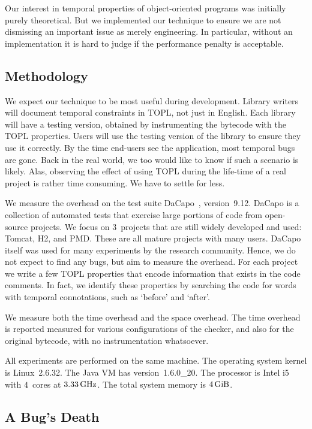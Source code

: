 \documentclass[9pt, preprint]{sigplanconf} %
\theoremstyle{definition}
\theoremstyle{remark}
\begin{document}
Our interest in temporal properties of object-oriented programs was initially purely theoretical.
But we implemented our technique to ensure we are not dismissing an important issue as merely engineering.
In particular, without an implementation it is hard to judge if the performance penalty is acceptable.

\subsection{Methodology} %

We expect our technique to be most useful during development.
Library writers will document temporal constraints in TOPL, not just in English.
Each library will have a testing version, obtained by instrumenting the bytecode with the TOPL properties.
Users will use the testing version of the library to ensure they use it correctly.
By the time end-users see the application, most temporal bugs are gone.
Back in the real world, we too would like to know if such a scenario is likely.
Alas, observing the effect of using TOPL during the life-time of a real project is rather time consuming.
We have to settle for less.

We measure the overhead on the test suite DaCapo~\cite{dblp:conf/oopsla/dacapo}, version~9.12.
DaCapo is a collection of automated tests that exercise large portions of code from open-source projects.
We focus on $3$~projects that are still widely developed and used: Tomcat, H2, and PMD\null.
These are all mature projects with many users.
DaCapo itself was used for many experiments by the research community.
Hence, we do not expect to find any bugs, but aim to measure the overhead.
For each project we write a few TOPL properties that encode information that exists in the code comments.
In fact, we identify these properties by searching the code for words with temporal connotations, such as `before' and `after'.

We measure both the time overhead and the space overhead.
The time overhead is reported measured for various configurations of the checker, and also for the original bytecode, with no instrumentation whatsoever.

All experiments are performed on the same machine.
The operating system kernel is Linux~2.6.32.
The Java VM has version~1.6.0\_20.
The processor is Intel i5 with $4$~cores at $3.33\rm\,GHz$.
The total system memory is $4\rm\,GiB$.

\subsection{A Bug's Death} %
\end{document}
